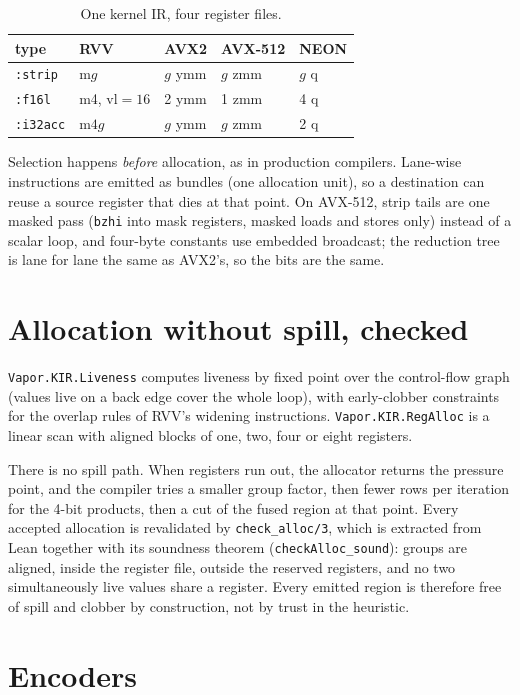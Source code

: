 \begin{table}[h]
\centering\small
\begin{tabular}{@{}lllll@{}}
\toprule
type & RVV & AVX2 & AVX-512 & NEON \\
\midrule
\texttt{:strip} & m$g$ & $g$ ymm & $g$ zmm & $g$ q \\
\texttt{:f16l} & m4, vl$=16$ & 2 ymm & 1 zmm & 4 q \\
\texttt{:i32acc} & m$4g$ & $g$ ymm & $g$ zmm & 2 q \\
\bottomrule
\end{tabular}
\caption{One kernel IR, four register files.}
\end{table}

Selection happens \emph{before} allocation, as in production compilers. Lane-wise instructions are
emitted as bundles (one allocation unit), so a destination can reuse a source register that dies at
that point. On AVX-512, strip tails are one masked pass (\texttt{bzhi} into mask registers, masked loads
and stores only) instead of a scalar loop, and four-byte constants use embedded broadcast; the
reduction tree is lane for lane the same as AVX2's, so the bits are the same.

\section{Allocation without spill, checked}

\texttt{Vapor.KIR.Liveness} computes liveness by fixed point over the control-flow graph (values live on
a back edge cover the whole loop), with early-clobber constraints for the overlap rules of RVV's
widening instructions. \texttt{Vapor.KIR.RegAlloc} is a linear scan with aligned blocks of one, two,
four or eight registers.

There is no spill path. When registers run out, the allocator returns the pressure point, and the
compiler tries a smaller group factor, then fewer rows per iteration for the 4-bit products, then a
cut of the fused region at that point. Every accepted allocation is revalidated by
\texttt{check\_alloc/3}, which is extracted from Lean together with its soundness theorem
(\texttt{checkAlloc\_sound}): groups are aligned, inside the register file, outside the reserved
registers, and no two simultaneously live values share a register. Every emitted region is therefore
free of spill and clobber by construction, not by trust in the heuristic.

\section{Encoders}

